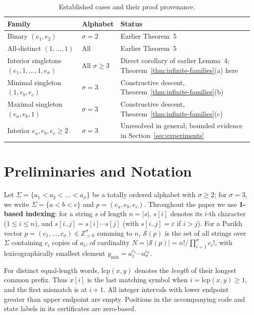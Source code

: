 \documentclass[11pt,a4paper]{article}
\theoremstyle{definition}
\newcommand{\lcp}{\mathrm{lcp}}
\begin{document}
\begin{table}[t]
\centering\small
\caption{Established cases and their proof provenance.}
\label{tab:status-summary}
\begin{tabular}{@{}p{.37\linewidth}p{.12\linewidth}p{.43\linewidth}@{}}
\toprule
Family & Alphabet & Status \\
\midrule
Binary $(e_1,e_2)$ & $\sigma=2$ & Earlier Theorem~5~\cite{BadkobehBannaiIKoppl2026} \\
All-distinct $(1,\dots,1)$ & All & Earlier Theorem~5~\cite{BadkobehBannaiIKoppl2026} \\
Interior singletons $(e_1,1,\dots,1,e_\sigma)$ & All $\sigma\ge3$ & Direct corollary of earlier Lemma~4; Theorem~\ref{thm:infinite-families}(a) here \\
Minimal singleton $(1,e_b,e_c)$ & $\sigma=3$ & Constructive descent, Theorem~\ref{thm:infinite-families}(b) \\
Maximal singleton $(e_a,e_b,1)$ & $\sigma=3$ & Constructive descent, Theorem~\ref{thm:infinite-families}(c) \\
Interior $e_a,e_b,e_c\ge2$ & $\sigma=3$ & Unresolved in general; bounded evidence in Section~\ref{sec:experiments} \\
\bottomrule
\end{tabular}
\end{table}

\section{Preliminaries and Notation}
\label{sec:prelim}

Let $\Sigma = \{a_1 < a_2 < \dots < a_\sigma\}$ be a totally ordered alphabet with $\sigma \ge 2$; for $\sigma = 3$, we write $\Sigma = \{a < b < c\}$ and $p = (e_a, e_b, e_c)$. Throughout the paper we use \textbf{1-based indexing}: for a string $s$ of length $n = |s|$, $s[i]$ denotes its $i$-th character ($1 \le i \le n$), and $s[i..j] = s[i]\cdots s[j]$ (with $s[i..j] = \varepsilon$ if $i > j$). For a Parikh vector $p = (c_1, \dots, c_\sigma) \in \mathbb{Z}_{>0}^\sigma$ summing to $n$, $\mathcal{S}(p)$ is the set of all strings over $\Sigma$ containing $c_i$ copies of $a_i$, of cardinality $N = |\mathcal{S}(p)| = n! / \prod_{i=1}^\sigma c_i!$, with lexicographically smallest element $y_{\min} = a_1^{c_1} \cdots a_\sigma^{c_\sigma}$.

For distinct equal-length words, $\lcp(x,y)$ denotes the \emph{length} of their longest common prefix. Thus $x[i]$ is the last matching symbol when $i=\lcp(x,y)\ge1$, and the first mismatch is at $i+1$. All integer intervals with lower endpoint greater than upper endpoint are empty. Positions in the accompanying code and state labels in its certificates are zero-based.
\end{document}
